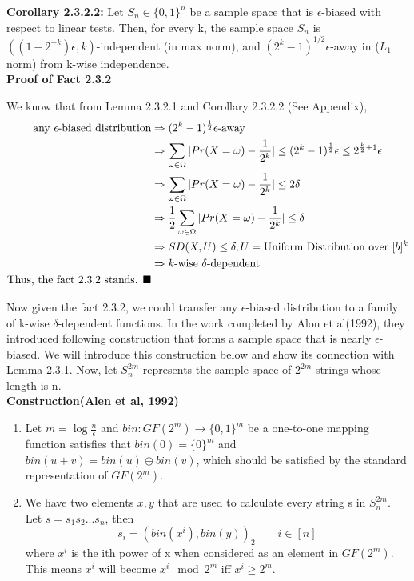 \documentclass[a4paper, english]{paper}
\begin{document}
	\noindent\textbf{Corollary 2.3.2.2:} Let $S_n \in \{0, 1\}^n$ be a sample space that is $\epsilon$-biased with respect to linear tests. Then, for every k, the sample space $S_n$ is $((1-2^{-k})\epsilon, k)$-independent (in max norm), and $(2^k-1)^{1/2}\epsilon$-away  in ($L_1$ norm) from k-wise independence. \\
	
	\noindent\textbf{Proof of Fact 2.3.2}\par
	\noindent We know that from Lemma 2.3.2.1 and Corollary 2.3.2.2 (See Appendix), 
	\begin{align*}
	\text{any $\epsilon$-biased distribution} &\Rightarrow (2^k-1)^{\frac12}\epsilon\text{-away}\\
	&\Rightarrow \sum_{\omega\in \Omega}| Pr(X = \omega) - \frac1{2^k}|\le (2^k-1)^{\frac12}\epsilon\le2^{\frac k2+1}\epsilon\\
	&\Rightarrow \sum_{\omega\in \Omega}| Pr(X = \omega) - \frac1{2^k}|\le 2\delta\\
	&\Rightarrow \frac12\sum_{\omega\in \Omega}| Pr(X = \omega) - \frac1{2^k}|\le \delta\\
 	&\Rightarrow SD(X,U)\le \delta, U=\text{Uniform Distribution over }[b]^k\\
	&\Rightarrow k\text{-wise }\delta\text{-dependent }\\
	\text{Thus, the fact 2.3.2 stands. $\hfill\blacksquare$}
	\end{align*}\par
 Now given the fact 2.3.2, we could transfer any $\epsilon$-biased distribution to a family of k-wise $\delta$-dependent functions. In the work completed by Alon et al(1992), they introduced following construction that forms a sample space that is nearly $\epsilon$-biased. We will introduce this construction below and show its connection with Lemma 2.3.1. Now, let $S^{2m}_n$ represents the sample space of $2^{2m}$ strings whose length is n.\\

	\noindent\textbf{Construction(Alen et al, 1992)}
	\begin{enumerate}
	\item Let $m=\log\frac n \epsilon$ and $bin: GF(2^m)\rightarrow\{0,1\}^m$ be a one-to-one mapping function satisfies that $bin(0)=\{0\}^m$ and $bin(u+v)=bin(u)\oplus bin(v)$, which should be satisfied by the standard representation of $GF(2^m)$.
	\item We have two elements $x,y$ that are used to calculate every string s in $S^{2m}_n$. Let $s = s_1s_2...s_n$, then $$s_i = (bin(x^i),bin(y))_2\qquad i\in[n]$$ where $x^i$ is the ith power of x when considered as an element in $GF(2^m)$. This means $x^i$ will become $x^i \mod 2^m$ iff $x^i\ge 2^m$.
	\end{enumerate}
\end{document}

